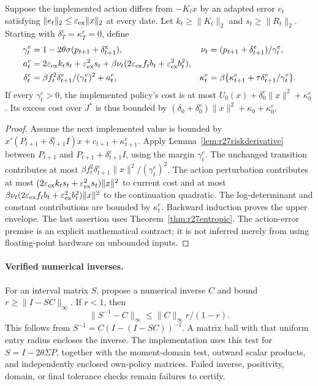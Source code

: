 \begin{proposition}
\label{prop:r27riskexecution}
Suppose the implemented action differs from $-K_tx$ by an adapted error
$e_t$ satisfying $\|e_t\|_2\leq\varepsilon_{\rm ex}\|x\|_2$ at every date.
Let $k_t\geq\|K_t\|_2$ and $s_t\geq\|R_t\|_2$.
Starting with $\delta_T^e=\kappa_T^e=0$, define
\begin{align*}
 \gamma_t^e&=1-2\theta\sigma(p_{t+1}+\delta_{t+1}^e),&
 \nu_t&=(p_{t+1}+\delta_{t+1}^e)/\gamma_t^e,\\
 a_t^e&=2\varepsilon_{\rm ex}k_ts_t+
             \varepsilon_{\rm ex}^2s_t
       +\beta\nu_t(2\varepsilon_{\rm ex}f_tb_t+
                         \varepsilon_{\rm ex}^2b_t^2),\\
 \delta_t^e&=\beta f_t^2\delta_{t+1}^e/(\gamma_t^e)^2+a_t^e,&
 \kappa_t^e&=\beta\{\kappa_{t+1}^e+
                    \tau\delta_{t+1}^e/\gamma_t^e\}.
\end{align*}
If every $\gamma_t^e>0$, the implemented policy's cost is at most
$U_0(x)+\delta_0^e\|x\|^2+\kappa_0^e$. Its excess cost over $J^*$ is thus
bounded by $(\delta_0+\delta_0^e)\|x\|^2+\kappa_0+\kappa_0^e$.
\end{proposition}
\begin{proof}
Assume the next implemented value is bounded by
$x'(P_{t+1}+\delta_{t+1}^eI)x+c_{t+1}+\kappa_{t+1}^e$.
Apply Lemma~\ref{lem:r27riskderivative} between $P_{t+1}$ and
$P_{t+1}+\delta_{t+1}^eI$, using the margin $\gamma_t^e$.
The unchanged transition contributes at most
$\beta f_t^2\delta_{t+1}^e\|x\|^2/(\gamma_t^e)^2$.
The action perturbation contributes at most
$(2\varepsilon_{\rm ex}k_ts_t+\varepsilon_{\rm ex}^2s_t)\|x\|^2$
to current cost and at most
$\beta\nu_t(2\varepsilon_{\rm ex}f_tb_t+
\varepsilon_{\rm ex}^2b_t^2)\|x\|^2$ to the continuation quadratic.
The log-determinant and constant contributions are bounded by
$\kappa_t^e$. Backward induction proves the upper envelope. The last assertion
uses Theorem~\ref{thm:r27entropic}. The action-error premise is an explicit
mathematical contract; it is not inferred merely from using floating-point
hardware on unbounded inputs.
\end{proof}

\paragraph{Verified numerical inverses.}
For an interval matrix $S$, propose a numerical inverse $C$ and bound
$r\geq\|I-SC\|_\infty$. If $r<1$, then
\[
 \|S^{-1}-C\|_\infty\leq\|C\|_\infty r/(1-r).
\]
This follows from $S^{-1}=C(I-(I-SC))^{-1}$. A matrix ball with that uniform
entry radius encloses the inverse. The implementation uses this test for
$S=I-2\theta\Sigma P$, together with the moment-domain test, outward scalar
products, and independently enclosed own-policy matrices. Failed inverse,
positivity, domain, or final tolerance checks remain failures to certify.

